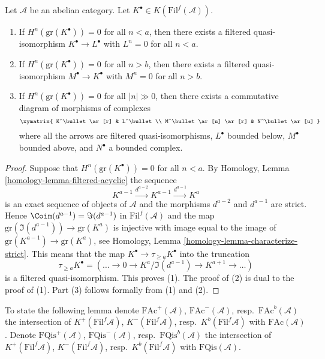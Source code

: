 \begin{lemma}
\label{lemma-filtered-complex-cohomology-bounded}
Let $\mathcal{A}$ be an abelian category.
Let $K^\bullet \in K(\text{Fil}^f(\mathcal{A}))$.
\begin{enumerate}
\item If $H^n(\text{gr}(K^\bullet)) = 0$ for all $n < a$, then there exists
a filtered quasi-isomorphism $K^\bullet \to L^\bullet$ with
$L^n = 0$ for all $n < a$.
\item If $H^n(\text{gr}(K^\bullet)) = 0$ for all $n > b$, then there exists
a filtered quasi-isomorphism $M^\bullet \to K^\bullet$ with
$M^n = 0$ for all $n > b$.
\item If $H^n(\text{gr}(K^\bullet)) = 0$ for all $|n| \gg 0$, then there
exists a commutative diagram of morphisms of complexes
$$
\xymatrix{
K^\bullet \ar[r] & L^\bullet \\
M^\bullet \ar[u] \ar[r] & N^\bullet \ar[u]
}
$$
where all the arrows are filtered quasi-isomorphisms, $L^\bullet$
bounded below, $M^\bullet$ bounded above, and $N^\bullet$ a bounded
complex.
\end{enumerate}
\end{lemma}

\begin{proof}
Suppose that $H^n(\text{gr}(K^\bullet)) = 0$ for all $n < a$. By
Homology, Lemma \ref{homology-lemma-filtered-acyclic}
the sequence
$$
K^{a - 1} \xrightarrow{d^{a - 2}} K^{a - 1} \xrightarrow{d^{a - 1}} K^a
$$
is an exact sequence of objects of $\mathcal{A}$ and the morphisms
$d^{a - 2}$ and $d^{a - 1}$ are strict. Hence
$\Coim(d^{a - 1}) = \Im(d^{a - 1})$ in $\text{Fil}^f(\mathcal{A})$
and the map $\text{gr}(\Im(d^{a - 1})) \to \text{gr}(K^a)$
is injective with image equal to the image of
$\text{gr}(K^{a - 1}) \to \text{gr}(K^a)$, see
Homology, Lemma \ref{homology-lemma-characterize-strict}.
This means that the map $K^\bullet \to \tau_{\geq a}K^\bullet$
into the truncation
$$
\tau_{\geq a}K^\bullet =
(\ldots \to 0 \to K^a/\Im(d^{a - 1}) \to K^{a + 1} \to \ldots)
$$
is a filtered quasi-isomorphism. This proves (1). The proof of (2)
is dual to the proof of (1). Part (3) follows formally from (1) and (2).
\end{proof}

\noindent
To state the following lemma denote
$\text{FAc}^{+}(\mathcal{A})$, $\text{FAc}^{-}(\mathcal{A})$,
resp.\ $\text{FAc}^b(\mathcal{A})$ the intersection of
$K^{+}(\text{Fil}^f\mathcal{A})$, $K^{-}(\text{Fil}^f\mathcal{A})$,
resp.\ $K^b(\text{Fil}^f\mathcal{A})$ with $\text{FAc}(\mathcal{A})$.
Denote $\text{FQis}^{+}(\mathcal{A})$, $\text{FQis}^{-}(\mathcal{A})$,
resp.\ $\text{FQis}^b(\mathcal{A})$ the intersection of
$K^{+}(\text{Fil}^f\mathcal{A})$, $K^{-}(\text{Fil}^f\mathcal{A})$,
resp.\ $K^b(\text{Fil}^f\mathcal{A})$ with $\text{FQis}(\mathcal{A})$.

